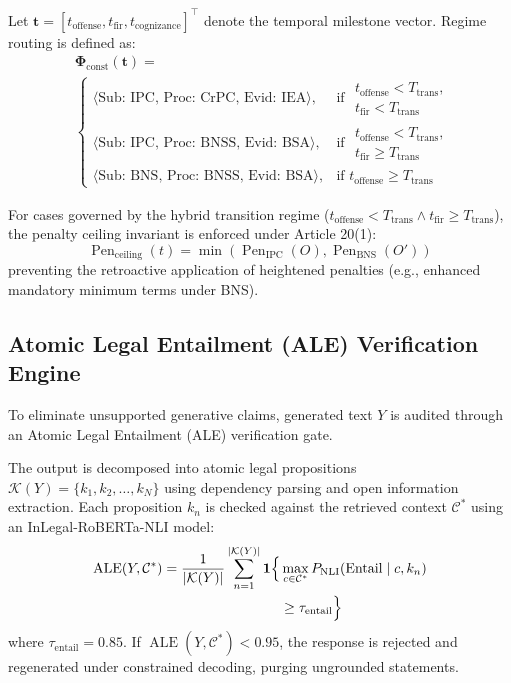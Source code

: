 \documentclass[conference]{IEEEtran}
\begin{document}
Let $\mathbf{t} = [t_{\text{offense}}, t_{\text{fir}}, t_{\text{cognizance}}]^\top$ denote the temporal milestone vector. Regime routing is defined as:
\begin{equation}
\begin{aligned}
&\mathbf{\Phi}_{\text{const}}(\mathbf{t}) = \\
&\begin{cases}
\langle \text{Sub: IPC, Proc: CrPC, Evid: IEA} \rangle, & \text{if } \substack{t_{\text{offense}} < T_{\text{trans}}, \\ t_{\text{fir}} < T_{\text{trans}}} \\[8pt]
\langle \text{Sub: IPC, Proc: BNSS, Evid: BSA} \rangle, & \text{if } \substack{t_{\text{offense}} < T_{\text{trans}}, \\ t_{\text{fir}} \ge T_{\text{trans}}} \\[6pt]
\langle \text{Sub: BNS, Proc: BNSS, Evid: BSA} \rangle, & \text{if } t_{\text{offense}} \ge T_{\text{trans}}
\end{cases}
\end{aligned}
\end{equation}

For cases governed by the hybrid transition regime ($t_{\text{offense}} < T_{\text{trans}} \land t_{\text{fir}} \ge T_{\text{trans}}$), the penalty ceiling invariant is enforced under Article 20(1):
\begin{equation}
\operatorname{Pen}_{\text{ceiling}}(t) = \min\left(\operatorname{Pen}_{\text{IPC}}(O), \operatorname{Pen}_{\text{BNS}}(O')\right)
\end{equation}
preventing the retroactive application of heightened penalties (e.g., enhanced mandatory minimum terms under BNS).

\subsection{Atomic Legal Entailment (ALE) Verification Engine}
To eliminate unsupported generative claims, generated text $Y$ is audited through an Atomic Legal Entailment (ALE) verification gate. 

The output is decomposed into atomic legal propositions $\mathcal{K}(Y) = \{k_1, k_2, \dots, k_N\}$ using dependency parsing and open information extraction. Each proposition $k_n$ is checked against the retrieved context $\mathcal{C}^*$ using an InLegal-RoBERTa-NLI model:
\begin{equation}
\begin{aligned}
\operatorname{ALE}(Y, \mathcal{C}^*) = \frac{1}{|\mathcal{K}(Y)|} \sum_{n=1}^{|\mathcal{K}(Y)|} \mathbf{1}\Bigl\{ &\max_{c \in \mathcal{C}^*} P_{\text{NLI}}(\text{Entail} \mid c, k_n) \\
&\ge \tau_{\text{entail}} \Bigr\}
\end{aligned}
\end{equation}
where $\tau_{\text{entail}} = 0.85$. If $\operatorname{ALE}(Y, \mathcal{C}^*) < 0.95$, the response is rejected and regenerated under constrained decoding, purging ungrounded statements.
\end{document}
